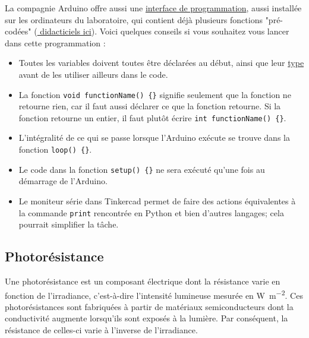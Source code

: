 \documentclass[english,french,12pt]{article}
\begin{document}
La compagnie Arduino offre aussi une \href{https://www.arduino.cc/en/software}{interface de programmation}, aussi installée sur les ordinateurs du laboratoire, qui contient déjà plusieurs fonctions "pré-codées" (\href{https://www.arduino.cc/en/Tutorial/BuiltInExamples}{
didacticiels ici}). Voici quelques conseils si vous souhaitez vous lancer dans cette programmation :
\begin{itemize}
    \item Toutes les variables doivent toutes être déclarées au début, ainsi que leur \href{https://en.wikipedia.org/wiki/C_data_types}{type} avant de les utiliser ailleurs dans le code.
    \item La fonction \texttt{void functionName()~\{\}} signifie seulement que la fonction ne retourne rien, car il faut aussi déclarer ce que la fonction retourne. Si la fonction retourne un entier, il faut plutôt écrire \texttt{int functionName()~\{\}}.
    \item L’intégralité de ce qui se passe lorsque l’Arduino exécute se trouve dans la fonction \texttt{loop()~\{\}}.
    \item Le code dans la fonction \texttt{setup()~\{\}} ne sera exécuté qu’une fois au démarrage de l’Arduino.
    \item Le moniteur série dans Tinkercad permet de faire des actions équivalentes à la commande \texttt{print} rencontrée en Python et bien d'autres langages; cela pourrait simplifier la tâche.
\end{itemize}

\subsection*{Photorésistance}
Une photorésistance est un composant électrique dont la résistance varie en fonction de l'irradiance, c'est-à-dire l’intensité lumineuse mesurée en \si[inter-unit-product=\ensuremath{{}\cdot{}}]{\watt\per\meter\squared}. Ces photorésistances sont fabriquées à partir de matériaux semiconducteurs dont la conductivité augmente lorsqu’ils sont exposés à la lumière. Par conséquent, la résistance de celles-ci varie à l'inverse de l'irradiance. 

\end{document}
